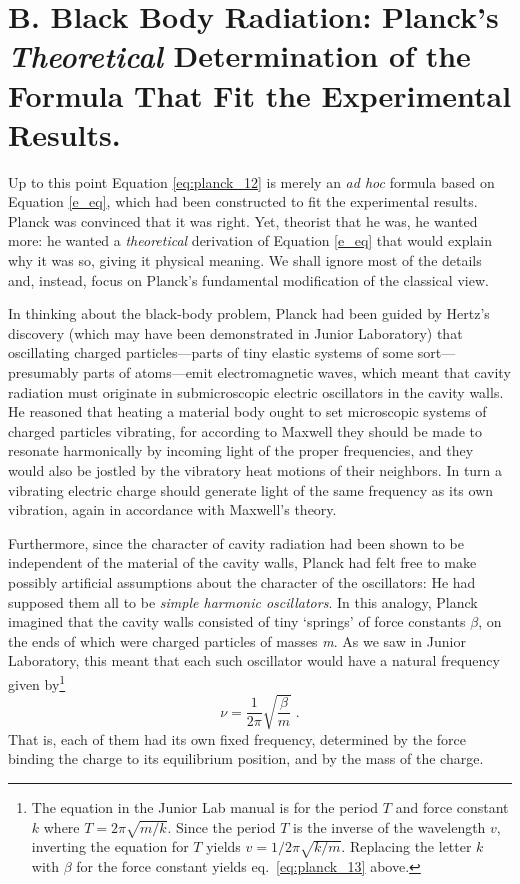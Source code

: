 \vspace{5pt}

\section*{B. Black Body Radiation: Planck's \emph{Theoretical}
Determination of the Formula That Fit the Experimental Results.}

Up to this point Equation \eqref{eq:planck_12} is merely an \emph{ad hoc} formula based on
Equation \eqref{e_eq}, which had been constructed to fit the experimental results.
Planck was convinced that it was right. Yet, theorist that he was, he
wanted more: he wanted a \emph{theoretical} derivation of Equation \eqref{e_eq}
that would explain why it was so, giving it physical meaning. We shall
ignore most of the details and, instead, focus on Planck's fundamental
modification of the classical view.

In thinking about the black-body problem, Planck had been guided by
Hertz's discovery (which may have been demonstrated in Junior
Laboratory) that oscillating charged particles---parts of tiny elastic
systems of some sort---presumably parts of atoms---emit electromagnetic
waves, which meant that cavity radiation must originate in
submicroscopic electric oscillators in the cavity walls. He reasoned
that heating a material body ought to set microscopic systems of charged
particles vibrating, for according to Maxwell they should be made to
resonate harmonically by incoming light of the proper frequencies, and
they would also be jostled by the vibratory heat motions of their
neighbors. In turn a vibrating electric charge should generate light of
the same frequency as its own vibration, again in accordance with
Maxwell's theory.

Furthermore, since the character of cavity radiation had been shown to
be independent of the material of the cavity walls, Planck had felt free
to make possibly artificial assumptions about the character of the
oscillators: He had supposed them all to be \emph{simple harmonic
oscillators}. In this analogy, Planck imagined that the cavity walls
consisted of tiny `springs' of force constants $\beta$, on the ends of
which were charged particles of masses \emph{m}. As we saw in Junior
Laboratory, this meant that each such oscillator would have a natural
frequency given by\footnote{The equation in the Junior Lab manual is for the
period $T$ and force constant $k$ where $T=2\pi\sqrt{m/k}$. Since the period $T$
is the inverse of the wavelength $v$, inverting the equation for $T$ yields
$v=1/2\pi\sqrt{k/m}$. Replacing the letter $k$ with $\beta$ for the force constant
yields eq.~\eqref{eq:planck_13} above.}
\begin{equation}\label{eq:planck_13}
\nu = \frac{1}{2\pi}\sqrt{\frac{\beta}{m}} \; . %
\end{equation}
That is, each of them had its own fixed frequency, determined by the
force binding the charge to its equilibrium position, and by the mass of
the charge.

